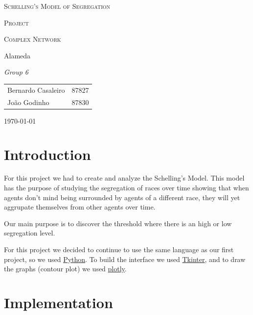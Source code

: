 \documentclass[a4paper,titlepage,11pt]{article}
\begin{document}
\begin{titlepage}
  \begin{center}
    {\scshape \huge Schelling's Model of Segregation \par}
    \vspace{1cm}

    {\scshape \LARGE Project \par}
    \vspace{1.5cm}

    {\scshape \Large Complex Network \par}
    \vspace{0.5cm}

    {\Large Alameda \par}
    \vfill

    {\itshape \Large Group 6 \par}
    \vfill

    \begin{tabular}{l l}
      Bernardo Casaleiro & 87827\\
      João Godinho & 87830\\
    \end{tabular}
    \vfill

    {\large \today\par}
  \end{center}
\end{titlepage}

\section{Introduction}
For this project we had to create and analyze the Schelling's Model. This model has the purpose of studying the segregation of races over time showing that when agents don't mind being surrounded by agents of a different race, they will yet aggrupate themselves from other agents over time.

Our main purpose is to discover the threshold where there is an high or low segregation level.

For this project we decided to continue to use the same language as our first project, so we used \href{https://www.python.org}{Python}. To build the interface we used \href{https://wiki.python.org/moin/TkInter}{Tkinter}, and to draw the graphs (contour plot) we used \href{https://plot.ly/}{plotly}.

\newpage

\section{Implementation}
\end{document}
